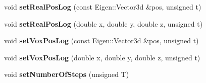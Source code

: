 \begin{DoxyCompactItemize}
\item 
\mbox{\label{class_walker_a1fff7bf0f8dde00b9909891f060ac009}} 
void {\bfseries set\+Real\+Pos\+Log} (const Eigen\+::\+Vector3d \&pos, unsigned t)
\item 
\mbox{\label{class_walker_a00a41d2b11cfeffae9ea66f4ea80a568}} 
void {\bfseries set\+Real\+Pos\+Log} (double x, double y, double z, unsigned t)
\item 
\mbox{\label{class_walker_adc7b7500ea403ce7dba872ef729c2c40}} 
void {\bfseries set\+Vox\+Pos\+Log} (const Eigen\+::\+Vector3d \&pos, unsigned t)
\item 
\mbox{\label{class_walker_adb197a756c457adc604b6605111e9b92}} 
void {\bfseries set\+Vox\+Pos\+Log} (double x, double y, double z, unsigned t)
\item 
\mbox{\label{class_walker_a288f810ee9e4de79a7fe9224de7438b3}} 
void {\bfseries set\+Number\+Of\+Steps} (unsigned T)
\end{DoxyCompactItemize}
